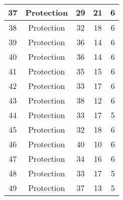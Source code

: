\documentclass[results.tex]{subfiles}
\begin{document}
\begin{center}
\begin{tabular}{| c || c | c | c | c |}
            \hline
            37                      & Protection                   & 29                     & 21                      & 6                    \\
            \hline
            38                      & Protection                   & 32                     & 18                      & 6                    \\
            \hline
            39                      & Protection                   & 36                     & 14                      & 6                    \\
            \hline
            40                      & Protection                   & 36                     & 14                      & 6                    \\
            \hline
            41                      & Protection                   & 35                     & 15                      & 6                    \\
            \hline
            42                      & Protection                   & 33                     & 17                      & 6                    \\
            \hline
            43                      & Protection                   & 38                     & 12                      & 6                    \\
            \hline
            44                      & Protection                   & 33                     & 17                      & 5                    \\
            \hline
            45                      & Protection                   & 32                     & 18                      & 6                    \\
            \hline
            46                      & Protection                   & 40                     & 10                      & 6                    \\
            \hline
            47                      & Protection                   & 34                     & 16                      & 6                    \\
            \hline
            48                      & Protection                   & 33                     & 17                      & 5                    \\
            \hline
            49                      & Protection                   & 37                     & 13                      & 5                    \\
            \hline
        \end{tabular}
    \end{center}
\end{document}
